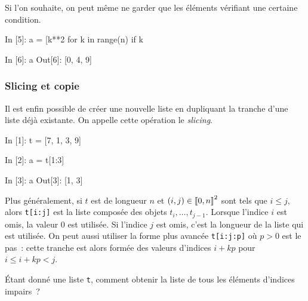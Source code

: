 \documentclass{magnolia}
\begin{document}
Si l'on souhaite, on peut même ne garder que les éléments vérifiant une certaine condition. 
\begin{pythoncode}
In [5]: a = [k**2 for k in range(n) if k %

In [6]: a
Out[6]: [0, 4, 9]  
\end{pythoncode}


\subsubsection{Slicing et copie}

Il est enfin possible de créer une nouvelle liste en dupliquant la tranche d'une liste déjà existante. On appelle
cette opération le \emph{slicing}.

\begin{pythoncode}
In [1]: t = [7, 1, 3, 9]

In [2]: a = t[1:3]

In [3]: a
Out[3]: [1, 3]
\end{pythoncode}

\noindent
Plus généralement, si $t$ est de longueur $n$ et $(i, j)\in\left\llbracket 0,n\right\rrbracket^2$ sont tels que $i\leq j$,
alors \verb_t[i:j]_ est la liste composée des objets $t_i, \ldots, t_{j-1}$. Lorsque l'indice
$i$ est omis, la valeur 0 est utilisée. Si
l'indice $j$ est omis, c'est la longueur de la liste qui est utilisée. On peut
aussi utiliser la forme plus avancée \verb!t[i:j:p]! où $p>0$ est le pas~:
cette tranche est alors formée des valeurs d'indices $i+kp$ pour $i\leq i+kp<j$.

\vspace{2ex}
\begin{exoUnique}
\exo Étant donné une liste \verb!t!, comment obtenir la liste de tous les éléments d'indices
  impairs~?
\end{exoUnique}
\vspace{2ex}
\end{document}
